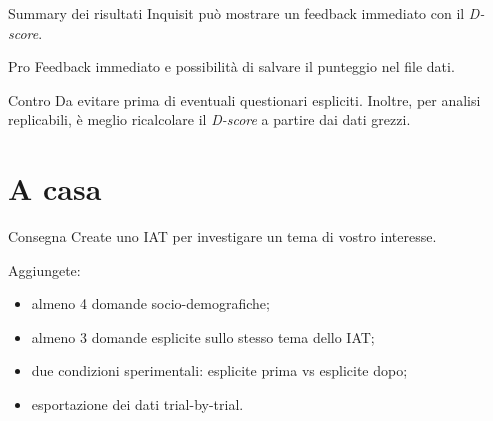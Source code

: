 \documentclass[compress]{beamer}
\begin{document}
\begin{frame}{Summary dei risultati}
Inquisit può mostrare un feedback immediato con il \emph{D-score}.

\vspace{3mm}
\begin{exampleblock}{Pro}
Feedback immediato e possibilità di salvare il punteggio nel file dati.
\end{exampleblock}

\begin{alertblock}{Contro}
Da evitare prima di eventuali questionari espliciti. Inoltre, per analisi replicabili, è meglio ricalcolare il \emph{D-score} a partire dai dati grezzi.
\end{alertblock}
\end{frame}

\section{A casa}

\begin{frame}{Consegna}
Create uno IAT per investigare un tema di vostro interesse.

\vspace{3mm}
Aggiungete:
\begin{itemize}
  \item almeno 4 domande socio-demografiche;
  \item almeno 3 domande esplicite sullo stesso tema dello IAT;
  \item due condizioni sperimentali: esplicite prima vs esplicite dopo;
  \item esportazione dei dati trial-by-trial.
\end{itemize}

\end{frame}
\end{document}
